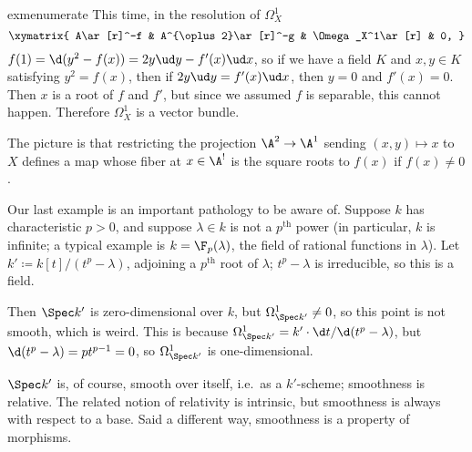 \begin{comp}{exm}{enumerate}
	This time, in the resolution of $\Omega_X^1$
	\begin{equation}
		\xymatrix{
			A\ar[r]^-f & A^{\oplus 2}\ar[r]^-g & \Omega_X^1\ar[r] & 0,
		}
	\end{equation}
	$f(1) = \d(y^2-f(x)) = 2y\ud y - f'(x)\ud x$, so if we have a field $K$ and $x,y\in K$ satisfying $y^2 = f(x)$,
	then if $2y\ud y = f'(x)\ud x$, then $y = 0$ and $f'(x) = 0$. Then $x$ is a root of $f$ and $f'$, but since we
	assumed $f$ is separable, this cannot happen. Therefore $\Omega_X^1$ is a vector bundle.

	The picture is that restricting the projection $\A^2\to\A^1$ sending $(x,y)\mapsto x$ to $X$ defines a map
	whose fiber at $x\in\A^!$ is the square roots to $f(x)$ if $f(x)\ne 0$.
	\item Our last example is an important pathology to be aware of. Suppose $k$ has characteristic $p > 0$, and
	suppose $\lambda\in k$ is not a $p^{\mathrm{th}}$ power (in particular, $k$ is infinite; a typical example is
	$k = \F_p(\lambda)$, the field of rational functions in $\lambda$). Let $k'\coloneqq k[t]/(t^p-\lambda)$,
	adjoining a $p^{\mathrm{th}}$ root of $\lambda$; $t^p-\lambda$ is irreducible, so this is a field.

	Then $\Spec k'$ is zero-dimensional over $k$, but $\Omega_{\Spec k'}^1\ne 0$, so this point is not smooth,
	which is weird. This is because $\Omega_{\Spec k'}^1 = k'\cdot\d t/\d(t^p-\lambda)$, but $\d(t^p-\lambda) =
	pt^{p-1} = 0$, so $\Omega_{\Spec k'}^1$ is one-dimensional.

	$\Spec k'$ is, of course, smooth over itself, i.e.\ as a $k'$-scheme; smoothness is relative. The related
	notion of relativity is intrinsic, but smoothness is always with respect to a base. Said a different way,
	smoothness is a property of morphisms.
	\qedhere
\end{comp}

